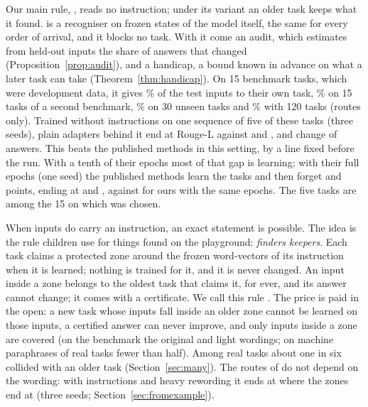 Our main rule, \recog{}, reads no instruction; under its variant \handicap{} an older task keeps what
it found. \recog{} is a recogniser on frozen states of the model itself,
the same for every order of arrival, and it blocks no task. With it come an audit, which estimates
from held-out inputs the share of answers that changed (Proposition~\ref{prop:audit}), and a
handicap, a bound known in advance on what a later task can take (Theorem~\ref{thm:handicap}). On 15
benchmark tasks, which were development data, it gives \AudDevLLamOneEnd{}\% of the test inputs to
their own task, \AudScaleLongThreeEnd{}\% on 15 tasks of a second benchmark, \AudFreshFourthLEnd{}\%
on 30 unseen tasks and \AudScaleAllHundredTwentyEnd{}\% with 120 tasks (routes only). Trained
without instructions on one sequence of five of these tasks (three seeds), plain adapters behind it
end at \AudSeedsRidgeAPOne{} Rouge-L against \AudSeedsGainloraAPOne{} and \AudSeedsInfloraAPOne{},
and change \AudSeedsRidgeChanged{} of \AudSeedsCompared{} answers. This beats the published methods in
this setting, by a line fixed before the run. With a tenth of their epochs most of that gap is
learning; with their full epochs (one seed) the published methods learn the tasks and then forget
\AudFullGainloraFTInt{} and \AudFullInfloraFTInt{} points, ending at \AudFullGainloraAPOne{} and
\AudFullInfloraAPOne{}, against \AudFullOursRidgeAPOne{} for ours with the same epochs. The five tasks are among the 15 on which \recog{} was chosen.

When inputs do carry an instruction, an exact statement is possible. The idea is the rule children
use for things found on the playground: \emph{finders keepers}. Each task claims a protected zone
around the frozen word-vectors of its instruction when it is learned; nothing is trained for it, and
it is never changed. An input inside a zone belongs to the oldest task that claims it, for ever, and
its answer cannot change; it comes with a certificate. We call this rule \cert{}. The price is paid in the open: a new task
whose inputs fall inside an older zone cannot be learned on those inputs, a certified answer can
never improve, and only inputs inside a zone are covered (on the benchmark the original and light
wordings; on machine paraphrases of real tasks fewer than half). Among \ManyTasks{} real tasks about
one in six collided with an older task (Section~\ref{sec:many}). The routes of \recog{} do not
depend on the wording: with instructions and heavy rewording it ends at \AudUThreeHeavyRidgeAPOne{}
where the zones end at \AudUThreeHeavyCertAPOne{} (three seeds; Section~\ref{sec:fromexample}).

